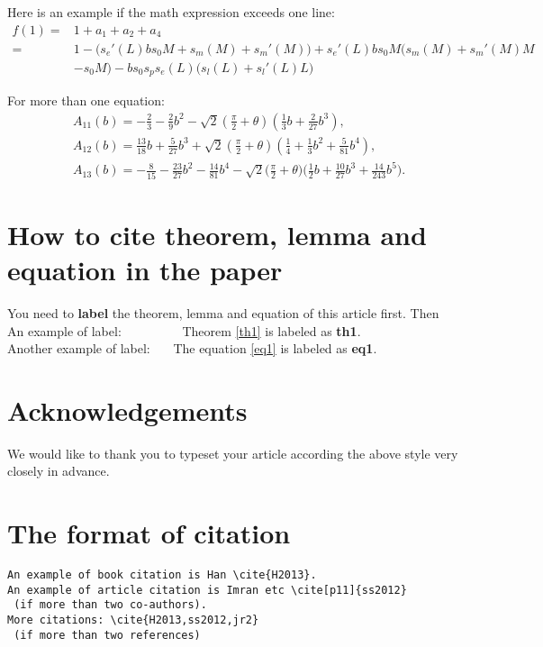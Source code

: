 \documentclass{swufeMath}
\begin{document}
Here is an example if the math expression exceeds one line:
\begin{align}
f(1)=&1 + a_1 + a_2 + a_4 \nonumber\\
=&1-\Big(s_e'(L)bs_0M + s_m(M)+s_m'(M)\Big)
+s_e'(L)bs_0M \Big(s_m(M)+s_m'(M)M\nonumber\\
&-s_0M\Big) - b s_0 s_ps_e(L)\Big(s_l(L)+s_l'(L)L\Big)
\end{align}

For more than one equation:
\begin{align}
&A_{11}(b)=-\frac{2}{3}-\frac{2}{9}b^2-\sqrt 2\left(\frac{\pi}{2}+\theta\right)\left(\frac{1}{3}b+\frac{2}{27}b^3\right),\nonumber\\
&A_{12}(b)=\frac{13}{18}b+\frac{5}{27}b^3+\sqrt2\left(\frac{\pi}{2}+\theta\right)\left(\frac{1}{4}+\frac{1}{3}b^2+\frac{5}{81}b^4\right),\nonumber\\
&A_{13}(b)=-\frac{8}{15}-\frac{23}{27}b^2-\frac{14}{81}b^4-\sqrt2\Big(\frac{\pi}{2}+\theta\Big)\Big(\frac{1}{2}b+\frac{10}{27}b^3+\frac{14}{243}b^5\Big).\label{eq1}
\end{align}





\section{How to cite theorem, lemma and equation in the paper}

You need to {\bf label} the theorem, lemma and equation of this article first. Then \\

An example of label: ~~~~~~~~~Theorem \ref{th1} is labeled as {\bf th1}. \\

Another example of label: ~~~The equation \eqref{eq1} is labeled as {\bf eq1}.


\section*{Acknowledgements}
We would like to thank you to typeset your article according the above style very closely in
advance.


\section*{The format of citation}
\begin{verbatim}
An example of book citation is Han \cite{H2013}.
An example of article citation is Imran etc \cite[p11]{ss2012}
 (if more than two co-authors).
More citations: \cite{H2013,ss2012,jr2}
 (if more than two references)
 \end{verbatim}
\end{document}
